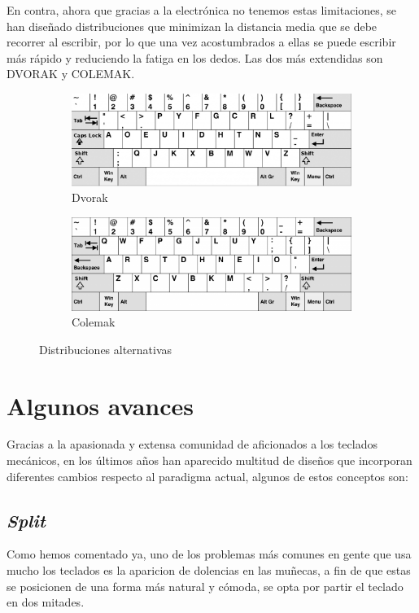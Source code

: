   En contra, ahora que gracias a la electrónica no tenemos estas limitaciones, se han diseñado distribuciones que minimizan la distancia media que se debe recorrer al escribir, por lo que una vez acostumbrados a ellas se puede escribir más rápido y reduciendo la fatiga en los dedos. Las dos más extendidas son DVORAK y COLEMAK. 
  \begin{figure}[H]
    \begin{subfigure}[b]{.5\textwidth}
      \centering
      \includegraphics[width=.6\textwidth]{images/dvorak}
      \caption{Dvorak}
    \end{subfigure} 
    \hfill
    \begin{subfigure}[b]{.5\textwidth}
      \centering
      \includegraphics[width=.6\textwidth]{images/colemak}
      \caption{Colemak}
    \end{subfigure}
    \caption{Distribuciones alternativas}
  \end{figure}

  \section{Algunos avances}
  Gracias a la apasionada y extensa comunidad de aficionados a los teclados mecánicos, en los últimos años han aparecido multitud de diseños que incorporan diferentes cambios respecto al paradigma actual, algunos de estos conceptos son:
    \subsection{\textit{Split}}
    Como hemos comentado ya, uno de los problemas más comunes en gente que usa mucho los teclados es la aparicion de dolencias en las muñecas, a fin de que estas se posicionen de una forma más natural y cómoda, se opta por partir el teclado en dos mitades.
    
